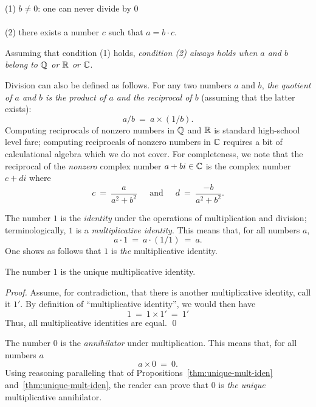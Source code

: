 \noindent
\hspace*{.35in}(1) $b \neq 0$: one can never divide by $0$ \\
\hspace*{.35in}{\em and} \\
\hspace*{.35in}(2) there exists a number $c$ such that $a = b \cdot c$.

\noindent
Assuming that condition (1) holds, {\em condition (2) always holds
  when $a$ and $b$ belong to $\mathbb{Q}$ or $\mathbb{R}$ or $\mathbb{C}$}.

Division can also be defined as follows.  For any two numbers $a$
and $b$, {\em the quotient of $a$ and $b$ is the product of $a$ and the
reciprocal of $b$} (assuming that the latter exists):
\[ a/b \ = \ a \times (1/b). \]
Computing reciprocals of nonzero numbers in $\mathbb{Q}$ and $\mathbb{R}$ is standard
high-school level fare; computing reciprocals of nonzero numbers in
$\mathbb{C}$ requires a bit of calculational algebra which we do not cover.
For completeness, we note that the reciprocal of the {\em nonzero}
complex number $a + bi \in \mathbb{C}$ is the complex number $c+di$ where
\[ c \ = \ \frac{a}{a^2 + b^2} \ \ \ \ \
\mbox{ and } \ \ \ \ \
d \ = \ \frac{-b}{a^2 + b^2}.
\]

\medskip

%
The number $1$ is the {\it identity} under the operations of
multiplication and division;
\index{number!identity under multiplication}
terminologically, $1$ is a {\it multiplicative identity}.  This means
that, for all numbers $a$,
\[ a \cdot 1 \ = \ a \cdot (1/1) \ = \ a. \]
One shows as follows that $1$ is {\em the} multiplicative identity.

\begin{prop}
\label{thm:unique-mult-iden}
The number $1$ is the unique multiplicative identity.
\end{prop}

\begin{proof}
Assume, for contradiction, that there is another multiplicative
identity, call it $1'$.  By definition of ``multiplicative identity'',
we would then have
\[ 1 \ = \ 1 \times 1' \ = \ 1' \]
Thus, all multiplicative identities are equal.  \qed
\end{proof}

\medskip

%
The number $0$ is the {\it annihilator} under
multiplication. This means that, for
all numbers $a$
\[ a \times 0 \ = \ 0. \]
Using reasoning paralleling that of
Propositions~\ref{thm:unique-mult-iden}
and~\ref{thm:unique-mult-iden}, the reader can prove that $0$ is {\em
  the unique} multiplicative annihilator.

